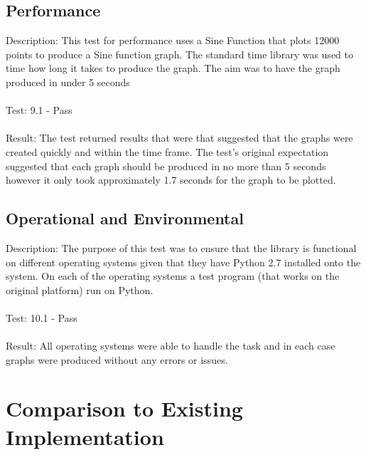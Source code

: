 \documentclass[12pt, titlepage]{article}
\begin{document}
		
\subsection{Performance}

Description: This test for performance uses a Sine Function that plots 12000 points to produce a Sine function graph. The standard time library was used to time how long it takes to produce the graph. The aim was to have the graph produced in under 5 seconds\\\\
Test: 9.1 - Pass\\\\
Result: The test returned results that were that suggested that the graphs were created quickly and within the time frame. The test’s original expectation suggested that each graph should be produced in no more than 5 seconds however it only took approximately 1.7 seconds for the graph to be plotted.

\subsection{Operational and Environmental}

Description: The purpose of this test was to ensure that the library is functional on different operating systems given that they have Python 2.7 installed onto the system. On each of the operating systems a test program (that works on the original platform) run on Python.\\\\
Test: 10.1 - Pass\\\\
Result: All operating systems were able to handle the task and in each case graphs were produced without any errors or issues.

	
\section{Comparison to Existing Implementation}	
\end{document}
